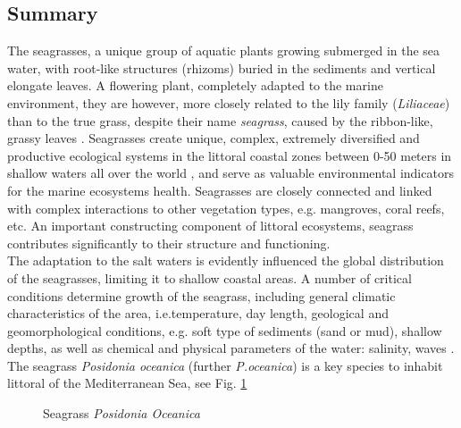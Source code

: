 \documentclass[10pt, a4paper]{article}
\begin{document}
\subsection{Summary}
The seagrasses, a unique group of aquatic plants growing submerged in the sea water, with root-like
structures (rhizoms) buried in the sediments and vertical elongate leaves. A flowering plant,
completely adapted to the marine environment, they are however, more closely related to the lily family
(\textit{Liliaceae}) than to the true grass, despite their name \textit{seagrass}, caused by the ribbon-like, grassy leaves
\cite{McKenzie08}\label{McKenzie08}. Seagrasses create unique, complex, extremely diversified and productive ecological systems in the
littoral coastal zones between 0-50 meters in shallow waters all over the world \cite{Hogarth07}\label{Hogarth07}, and
serve as valuable environmental indicators for the marine ecosystems health. Seagrasses are closely
connected and linked with complex interactions to other vegetation types, e.g. mangroves, coral reefs,
etc. An important constructing component of littoral ecosystems, seagrass contributes significantly to
their structure and functioning.\\
The adaptation to the salt waters is evidently influenced the global distribution of the seagrasses,
limiting it to shallow coastal areas. A number of critical conditions determine growth of the seagrass,
including general climatic characteristics of the area, i.e.temperature, day length, geological and
geomorphological conditions, e.g. soft type of sediments (sand or mud), shallow depths, as well as
chemical and physical parameters of the water: salinity, waves \cite{McKenzie02}\label{McKenzie02}.
The seagrass \textit{Posidonia oceanica} (further \textit{P.oceanica}) is a key species to inhabit littoral of the
Mediterranean Sea, see Fig. \ref{fig:1}

\begin{figure}[h]
	\centering
	\hspace{2mm}
	\caption{Seagrass \textit{Posidonia Oceanica}}
	\label{fig:1}
\end{figure}
\end{document}
